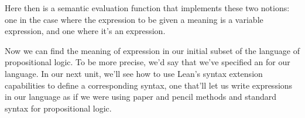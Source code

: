 \documentclass[letterpaper,10pt,english]{sphinxmanual}
\begin{document}
\sphinxAtStartPar
Here then is a semantic evaluation function that implements
these two notions: one in the case where the expression to
be given a meaning is a variable expression, and one where
it’s an  expression.

\begin{sphinxVerbatim}[commandchars=\\\{\}]
         
      
            
            
\end{sphinxVerbatim}

\sphinxAtStartPar
Now we can find the meaning of  expression in our
initial subset of the language of propositional logic.
To be more precise, we’d say that we’ve specified an
 for our language. In our next unit,
we’ll see how to use Lean’s syntax extension capabilities
to define a corresponding  syntax, one that’ll
let us write expressions in our language as if we were
using paper and pencil methods and standard syntax for
propositional logic.
\end{document}
